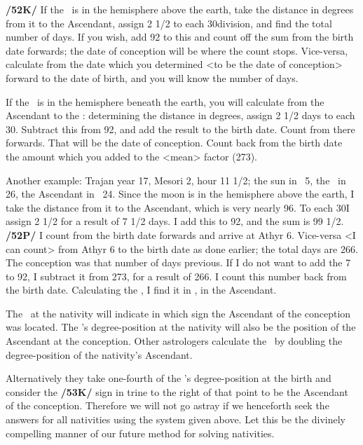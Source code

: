 \textbf{/52K/} If the \Moon\, is in the hemisphere above the earth, take the distance in degrees from it to the
Ascendant, assign 2 1/2 to each 30\deg division, and find the total number of days. If you wish, add 92 to this and count off the sum from the birth date forwards; the date of conception will be where the count stops. Vice-versa, calculate from the date which you determined <to be the date of conception> forward to the date of birth, and you will know the number of days. 

If the \Moon\, is in the hemisphere beneath the earth, you will calculate from the Ascendant to the \Moon: determining the distance in degrees, assign 2 1/2 days to each 30\deg. Subtract this from 92, and add the result to the birth date. Count from there forwards. That will be the date of conception. Count back from the birth date the amount which you added to the <mean> factor (273).

Another example: Trajan year 17, Mesori 2, hour 11 1/2; the sun in \Leo\, 5\deg, the \Moon\, in \Libra\, 26\deg, the Ascendant in \Capricorn\, 24\deg. Since the moon is in the hemisphere above the earth, I take the distance
from it to the Ascendant, which is very nearly 96\deg. To each 30\deg I assign 2 1/2 for a result of 7 1/2 days. I add this to 92, and the sum is 99 1/2. \textbf{/52P/} I count from the birth date forwards and arrive at Athyr 6. Vice-versa <I can count> from Athyr 6 to the birth date as done earlier; the total days are 266. The conception was that number of days previous. If I do not want to add the 7 to 92, I subtract it from 273, for a result of 266. I count this number back from the birth date. Calculating the \Moon, I find it in
\Capricorn, in the Ascendant.

The \Moon\, at the nativity will indicate in which sign the Ascendant of the conception was located. The \Moon’s degree-position at the nativity will also be the position of the Ascendant at the conception. Other astrologers calculate the \Moon\, by doubling the degree-position of the nativity’s Ascendant.

Alternatively they take one-fourth of the \Sun’s degree-position at the birth and consider the \textbf{/53K/} sign in
trine to the right of that point to be the Ascendant of the conception. Therefore we will not go astray if we henceforth seek the answers for all nativities using the system given above. Let this be the divinely compelling manner of our future method for solving nativities.

\newpage